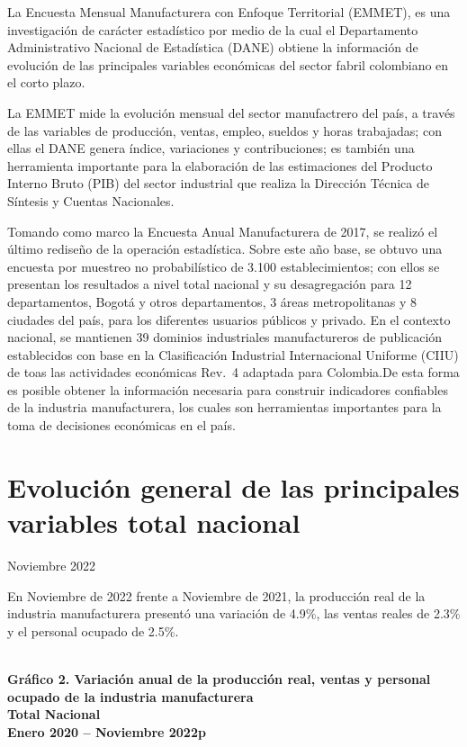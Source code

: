 \documentclass[
]{article}
\begin{document}
La Encuesta Mensual Manufacturera con Enfoque Territorial (EMMET), es
una investigación de carácter estadístico por medio de la cual el
Departamento Administrativo Nacional de Estadística (DANE) obtiene la
información de evolución de las principales variables económicas del
sector fabril colombiano en el corto plazo.

La EMMET mide la evolución mensual del sector manufactrero del país, a
través de las variables de producción, ventas, empleo, sueldos y horas
trabajadas; con ellas el DANE genera índice, variaciones y
contribuciones; es también una herramienta importante para la
elaboración de las estimaciones del Producto Interno Bruto (PIB) del
sector industrial que realiza la Dirección Técnica de Síntesis y Cuentas
Nacionales.

Tomando como marco la Encuesta Anual Manufacturera de 2017, se realizó
el último rediseño de la operación estadística. Sobre este año base, se
obtuvo una encuesta por muestreo no probabilístico de 3.100
establecimientos; con ellos se presentan los resultados a nivel total
nacional y su desagregación para 12 departamentos, Bogotá y otros
departamentos, 3 áreas metropolitanas y 8 ciudades del país, para los
diferentes usuarios públicos y privado. En el contexto nacional, se
mantienen 39 dominios industriales manufactureros de publicación
establecidos con base en la Clasificación Industrial Internacional
Uniforme (CIIU) de toas las actividades económicas Rev.~4 adaptada para
Colombia.De esta forma es posible obtener la información necesaria para
construir indicadores confiables de la industria manufacturera, los
cuales son herramientas importantes para la toma de decisiones
económicas en el país.

\newpage

\hypertarget{evoluciuxf3n-general-de-las-principales-variables-total-nacional}{%
\section{Evolución general de las principales variables total
nacional}\label{evoluciuxf3n-general-de-las-principales-variables-total-nacional}}

Noviembre 2022

En Noviembre de 2022 frente a Noviembre de 2021, la producción real de
la industria manufacturera presentó una variación de 4.9\%, las ventas
reales de 2.3\% y el personal ocupado de 2.5\%.\\
\strut \\
\textbf{Gráfico 2. Variación anual de la producción real, ventas y personal ocupado de la industria manufacturera}\\
\textbf{Total Nacional}\\
\textbf{Enero 2020 – Noviembre 2022p}\\
\end{document}
